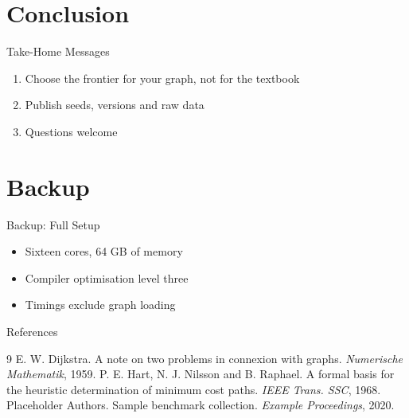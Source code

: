 \documentclass[aspectratio=43]{beamer}
\begin{document}
\section{Conclusion}
\begin{frame}{Take-Home Messages}
  \begin{enumerate}
    \item Choose the frontier for your graph, not for the textbook
    \item Publish seeds, versions and raw data
    \item Questions welcome
  \end{enumerate}
\end{frame}

\appendix
\section*{Backup}
\begin{frame}[label=backup-setup]{Backup: Full Setup}
  \small
  \begin{itemize}
    \item Sixteen cores, 64 GB of memory
    \item Compiler optimisation level three
    \item Timings exclude graph loading
  \end{itemize}
\end{frame}

\begin{frame}{References}
  \footnotesize
  \begin{thebibliography}{9}
     E. W. Dijkstra. A note on two problems in connexion with graphs. \emph{Numerische Mathematik}, 1959.
     P. E. Hart, N. J. Nilsson and B. Raphael. A formal basis for the heuristic determination of minimum cost paths. \emph{IEEE Trans. SSC}, 1968.
     Placeholder Authors. Sample benchmark collection. \emph{Example Proceedings}, 2020.
  \end{thebibliography}
\end{frame}
\end{document}
